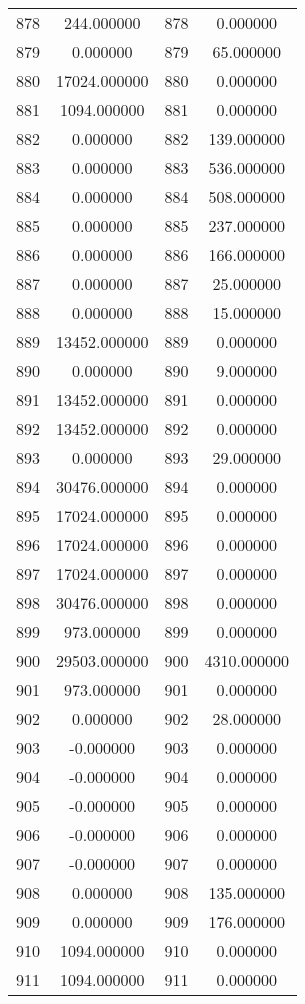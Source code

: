 \documentclass[12pt]{article}
\begin{document}
\begin{longtable}{@{}cccc@{}}
878 & 244.000000 & 878 & 0.000000 \\
879 & 0.000000 & 879 & 65.000000 \\
880 & 17024.000000 & 880 & 0.000000 \\
881 & 1094.000000 & 881 & 0.000000 \\
882 & 0.000000 & 882 & 139.000000 \\
883 & 0.000000 & 883 & 536.000000 \\
884 & 0.000000 & 884 & 508.000000 \\
885 & 0.000000 & 885 & 237.000000 \\
886 & 0.000000 & 886 & 166.000000 \\
887 & 0.000000 & 887 & 25.000000 \\
888 & 0.000000 & 888 & 15.000000 \\
889 & 13452.000000 & 889 & 0.000000 \\
890 & 0.000000 & 890 & 9.000000 \\
891 & 13452.000000 & 891 & 0.000000 \\
892 & 13452.000000 & 892 & 0.000000 \\
893 & 0.000000 & 893 & 29.000000 \\
894 & 30476.000000 & 894 & 0.000000 \\
895 & 17024.000000 & 895 & 0.000000 \\
896 & 17024.000000 & 896 & 0.000000 \\
897 & 17024.000000 & 897 & 0.000000 \\
898 & 30476.000000 & 898 & 0.000000 \\
899 & 973.000000 & 899 & 0.000000 \\
900 & 29503.000000 & 900 & 4310.000000 \\
901 & 973.000000 & 901 & 0.000000 \\
902 & 0.000000 & 902 & 28.000000 \\
903 & -0.000000 & 903 & 0.000000 \\
904 & -0.000000 & 904 & 0.000000 \\
905 & -0.000000 & 905 & 0.000000 \\
906 & -0.000000 & 906 & 0.000000 \\
907 & -0.000000 & 907 & 0.000000 \\
908 & 0.000000 & 908 & 135.000000 \\
909 & 0.000000 & 909 & 176.000000 \\
910 & 1094.000000 & 910 & 0.000000 \\
911 & 1094.000000 & 911 & 0.000000 \\

\end{longtable}
\end{document}
